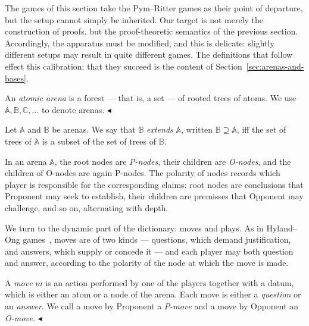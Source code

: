 \documentclass{lipics-v2021}
\newcommand{\fillBox}{\hfill$\blacktriangleleft$}
\newcommand{\arena}[1]{\mathbb{#1}}                     %
\newcommand{\atree}[2]{#1 \Rightarrow #2}              %
\newcommand{\At}{\mathit{At}}                           %
\begin{document}
The games of this section take the Pym--Ritter games as
their point of departure, but the setup cannot simply be inherited. Our target is not merely the construction of proofs, but the proof-theoretic semantics of the previous section. Accordingly, the apparatus must be modified, and this is delicate: slightly different setups may result in quite different games. The definitions that follow effect this calibration;
that they succeed is the content of Section~\ref{sec:arenas-and-bases}.
\begin{definition}
\label{def:atomic-arena}
An \emph{atomic arena} is a forest --- that is, a set --- of rooted trees of atoms. We use $\arena{A}, \arena{B}, \arena{C}, \ldots$ to denote arenas. \fillBox
\end{definition}
 
Let $\arena{A}$ and $\arena{B}$ be arenas. We say that $\arena{B}$ \emph{extends} $\arena{A}$, written $\arena{B} \supseteq \arena{A}$, iff the set of trees of $\arena{A}$ is a subset of the set of trees of $\arena{B}$.
 
In an arena $\arena{A}$, the root nodes are \emph{P-nodes}, their children are \emph{O-nodes}, and the children of O-nodes are again P-nodes. The polarity of nodes records which player is responsible for the corresponding claims: root nodes are conclusions that Proponent may seek to establish, their children are premisses that Opponent may challenge, and so on, alternating with depth.
 
We turn to the dynamic part of the dictionary: moves and plays. As in Hyland--Ong games~\cite{HYLAND2000285}, moves are of two kinds --- questions, which demand justification, and answers, which supply or concede it --- and each player may both question and answer, according to the polarity of the node at which the move is made.
\begin{definition}[Move]
\label{def:move}
A \emph{move} $m$ is an action performed by one of the players together with a
datum, which is either an atom or a node of the arena. Each move is either a
\emph{question} or an \emph{answer}. We call a move by Proponent a
\emph{P-move} and a move by Opponent an \emph{O-move}. \fillBox
\end{definition}
 
\end{document}
